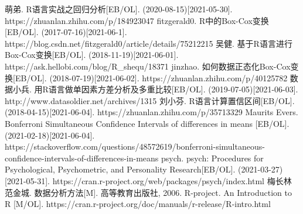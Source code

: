 \documentclass[11pt]{article}
\begin{document}
\begin{thebibliography}{1}

萌弟. R语言实战之回归分析[EB/OL]. (2020-08-15)[2021-05-30]. https://zhuanlan.zhihu.com/p/184923047
fitzgerald0. R中的Box-Cox变换[EB/OL]. (2017-07-16)[2021-06-1]. https://blog.csdn.net/fitzgerald0/article/details/75212215
吴健. 基于R语言进行Box-Cox变换[EB/OL]. (2018-11-19)[2021-06-01]. https://ask.hellobi.com/blog/R\_shequ/18371
jinzhao. 如何数据正态化Box-Cox变换[EB/OL]. (2018-07-19)[2021-06-02]. https://zhuanlan.zhihu.com/p/40125782
数据小兵. 用R语言做单因素方差分析及多重比较[EB/OL]. (2019-07-05)[2021-06-03]. http://www.datasoldier.net/archives/1315
刘小芬. R语言计算置信区间[EB/OL]. (2018-04-15)[2021-06-04]. https://zhuanlan.zhihu.com/p/35713329
Maurits Evers. Bonferroni Simultaneous Confidence Intervals of differences in means [EB/OL]. (2021-02-18)[2021-06-04]. https://stackoverflow.com/questions/48572619/bonferroni-simultaneous-confidence-intervals-of-differences-in-means
psych. psych: Procedures for Psychological, Psychometric, and Personality Research[EB/OL]. (2021-03-27)[2021-05-31]. https://cran.r-project.org/web/packages/psych/index.html
梅长林 范金城. 数据分析方法[M]. 高等教育出版社, 2006.
R-project. An Introduction to R [M/OL]. https://cran.r-project.org/doc/manuals/r-release/R-intro.html
\end{thebibliography}
    
\end{document}
